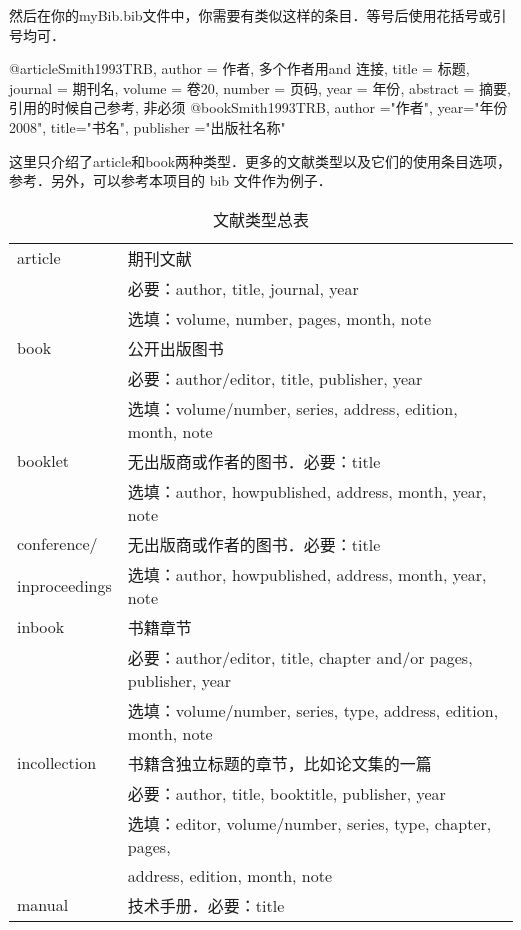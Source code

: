 然后在你的myBib.bib文件中，你需要有类似这样的条目．等号后使用花括号或引号均可．
\begin{latex}
@article{Smith1993TRB,
    author = {作者, 多个作者用and 连接},
    title = {标题},
    journal = {期刊名},
    volume = {卷20},
    number = {页码},
    year = {年份},
    abstract = {摘要, 引用的时候自己参考, 非必须}}
@book{Smith1993TRB,
    author ="作者",
    year="年份2008",
    title="书名",
    publisher ="出版社名称"}
\end{latex}

这里只介绍了article和book两种类型．更多的文献类型以及它们的使用条目选项，参考．另外，可以参考本项目的 bib 文件作为例子．

\begin{table}[!htb]
\centering
\caption{\bibtex 文献类型总表}
\label{tab:bibtype}
\begin{tabular}{>{\ttfamily}ll}
\hline
article & 期刊文献 \\
& 必要：author, title, journal, year \\
& 选填：volume, number, pages, month, note \\
\hline
book & 公开出版图书 \\
& 必要：author/editor, title, publisher, year \\
& 选填：volume/number, series, address, edition, month, note \\
\hline
booklet & 无出版商或作者的图书．必要：title\\
& 选填：author, howpublished, address, month, year, note \\
\hline
conference/ & 无出版商或作者的图书．必要：title \\
inproceedings & 选填：author, howpublished, address, month, year, note \\
\hline
inbook & 书籍章节 \\
& 必要：author/editor, title, chapter and/or pages, publisher, year\\
& 选填：volume/number, series, type, address, edition, month, note\\
\hline
incollection & 书籍含独立标题的章节，比如论文集的一篇 \\
& 必要：author, title, booktitle, publisher, year \\
& 选填：editor, volume/number, series, type, chapter, pages, \\
& address, edition, month, note \\
\hline
manual & 技术手册．必要：title \\

\end{tabular}
\end{table}
